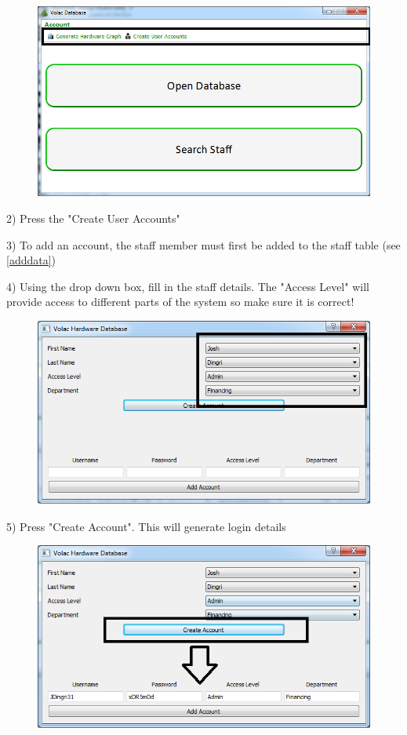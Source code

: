 \begin{figure}[H]
    \includegraphics[width=\textwidth]{./Manual/Images/graph1.png}
\end{figure}

2) Press the "Create User Accounts"

3) To add an account, the staff member must first be added to the staff table (see \ref{adddata})

4) Using the drop down box, fill in the staff details. The "Access Level" will provide access to different parts of the system so make sure it is correct! 

\begin{figure}[H]
    \includegraphics[width=\textwidth]{./Manual/Images/account2.png}
\end{figure}

5) Press "Create Account". This will generate login details

\begin{figure}[H]
    \includegraphics[width=\textwidth]{./Manual/Images/account3.png}
\end{figure}

